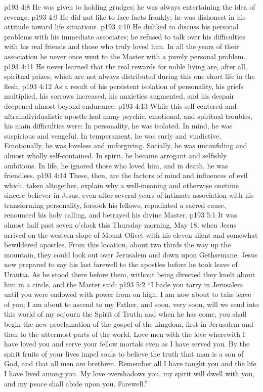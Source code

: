 \pc \vs p193 4:8 \bibnobreakspace He was given to holding grudges; he was always entertaining the idea of revenge.\plusone
\pc \vs p193 4:9 \bibnobreakspace He did not like to face facts frankly; he was dishonest in his attitude toward life situations.
\pc \vs p193 4:10 \bibnobreakspace He disliked to discuss his personal problems with his immediate associates; he refused to talk over his difficulties with his real friends and those who truly loved him. In all the years of their association he never once went to the Master with a purely personal problem.
\pc \vs p193 4:11 \bibnobreakspace He never learned that the real rewards for noble living are, after all, spiritual prizes, which are not always distributed during this one short life in the flesh.
\pc \vs p193 4:12 As a result of his persistent isolation of personality, his griefs multiplied, his sorrows increased, his anxieties augmented, and his despair deepened almost beyond endurance.
\vs p193 4:13 While this self\hyp{}centered and ultraindividualistic apostle had many psychic, emotional, and spiritual troubles, his main difficulties were: In personality, he was isolated. In mind, he was suspicious and vengeful. In temperament, he was surly and vindictive. Emotionally, he was loveless and unforgiving. Socially, he was unconfiding and almost wholly self\hyp{}contained. In spirit, he became arrogant and selfishly ambitious. In life, he ignored those who loved him, and in death, he was friendless.
\vs p193 4:14 These, then, are the factors of mind and influences of evil which, taken altogether, explain why a well\hyp{}meaning and otherwise onetime sincere believer in Jesus, even after several years of intimate association with his transforming personality, forsook his fellows, repudiated a sacred cause, renounced his holy calling, and betrayed his divine Master.
\vs p193 5:1 It was almost half past seven o’clock this Thursday morning, May 18, when Jesus arrived on the western slope of Mount Olivet with his eleven silent and somewhat bewildered apostles. From this location, about two thirds the way up the mountain, they could look out over Jerusalem and down upon Gethsemane. Jesus now prepared to say his last farewell to the apostles before he took leave of Urantia. As he stood there before them, without being directed they knelt about him in a circle, and the Master said:
\pc \vs p193 5:2 \textcolor{ubdarkred}{“I bade you tarry in Jerusalem until you were endowed with power from on high. I am now about to take leave of you; I am about to ascend to my Father, and soon, very soon, will we send into this world of my sojourn the Spirit of Truth; and when he has come, you shall begin the new proclamation of the gospel of the kingdom, first in Jerusalem and then to the uttermost parts of the world. Love men with the love wherewith I have loved you and serve your fellow mortals even as I have served you. By the spirit fruits of your lives impel souls to believe the truth that man is a son of God, and that all men are brethren. Remember all I have taught you and the life I have lived among you. My love overshadows you, my spirit will dwell with you, and my peace shall abide upon you. Farewell.”}\plusone
